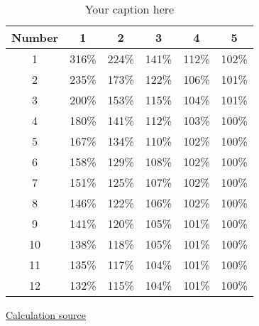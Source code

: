 \begin{table}[htb]
    \centering
    \begin{tabular}{c|ccccc}
        \textbf{Number} & \textbf{1} & \textbf{2} & \textbf{3} & \textbf{4} & \textbf{5} \\ \hline
        1 & 316\% & 224\% & 141\% & 112\% & 102\% \\
        2 & 235\% & 173\% & 122\% & 106\% & 101\% \\
        3 & 200\% & 153\% & 115\% & 104\% & 101\% \\
        4 & 180\% & 141\% & 112\% & 103\% & 100\% \\
        5 & 167\% & 134\% & 110\% & 102\% & 100\% \\
        6 & 158\% & 129\% & 108\% & 102\% & 100\% \\
        7 & 151\% & 125\% & 107\% & 102\% & 100\% \\
        8 & 146\% & 122\% & 106\% & 102\% & 100\% \\
        9 & 141\% & 120\% & 105\% & 101\% & 100\% \\
        10 & 138\% & 118\% & 105\% & 101\% & 100\% \\
        11 & 135\% & 117\% & 104\% & 101\% & 100\% \\
        12 & 132\% & 115\% & 104\% & 101\% & 100\% \\
    \end{tabular}
    \caption{Your caption here}
    \label{table:more_uncertainties}
\end{table}

\href{https://docs.google.com/spreadsheets/d/e/2PACX-1vTSial-WTQY0PDA2uLyeZGWxRKeqSEUTQ8Ir32RFY4fW93_aPfC6aD6Loooz6PsjEhB5QSiTCRI1nUo/pubhtml}{Calculation source}
